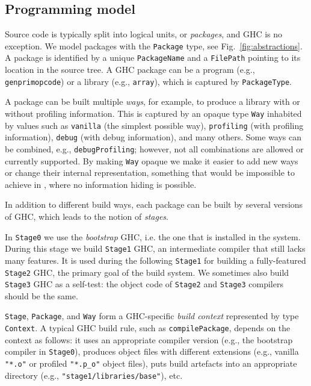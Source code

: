 \subsection{Programming model}

Source code is typically split into logical units, or \emph{packages},
and GHC is no exception. We model packages with the \texttt{Package}
type, see Fig.~\ref{fig:abstractions}. A package is identified by a unique
\texttt{PackageName} and a \texttt{FilePath} pointing to its location in the
source tree. A GHC package can be a program (e.g., \texttt{genprimopcode}) or a
library (e.g., \texttt{array}), which is captured by \texttt{PackageType}.

A package can be built multiple \emph{ways}, for example, to produce a library
with or without profiling information. This is captured by an opaque
type \texttt{Way} inhabited by values such as \texttt{vanilla} (the simplest
possible way), \texttt{profiling} (with profiling information), \texttt{debug} (with
debug information), and many others. Some ways can be combined, e.g.,
\texttt{debugProfiling}; however, not all combinations are allowed or currently
supported. By making \texttt{Way} opaque we make it easier to add new ways
or change their internal representation, something that would be
impossible to achieve in \make{}, where no information hiding is
possible.
 
In addition to different build ways, each package can be built by several
versions of GHC, which leads to the notion of \emph{stages}.

In \texttt{Stage0} we use the \emph{bootstrap} GHC, i.e. the one that is
installed in the system. During this stage we build \texttt{Stage1} GHC, an
intermediate compiler that still lacks many features. It is used during the
following \texttt{Stage1} for building a fully-featured \texttt{Stage2} GHC, the
primary goal of the build system. We sometimes also build \texttt{Stage3} GHC as
a self-test: the object code of \texttt{Stage2} and \texttt{Stage3} compilers
should be the same.

\texttt{Stage}, \texttt{Package}, and \texttt{Way} form a GHC-specific
\emph{build context} represented by type \texttt{Context}. A typical GHC build
rule, such as \texttt{compilePackage}, depends on the context as follows: it
uses an appropriate compiler version (e.g., the bootstrap compiler in
\texttt{Stage0}), produces object files with different extensions (e.g.,
vanilla \texttt{"*.o"} or profiled \texttt{"*.p\_o"} object files), puts build
artefacts into an appropriate directory (e.g.,
\texttt{"stage1/libraries/base"}), etc.


